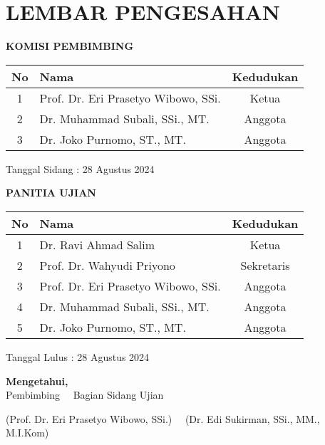 \chapter*{LEMBAR PENGESAHAN}

\begin{center}

\vspace{0.75cm}

{\bf KOMISI PEMBIMBING}

\vspace{0.5cm}

\begin{tabular}{|c|p{7cm}|c|}
\hline
\textbf{No} & \centering\textbf{Nama} & \textbf{Kedudukan}\\
\hline

 1& Prof. Dr. Eri Prasetyo Wibowo, SSi. & Ketua \\ \hline
 2 & Dr. Muhammad Subali, SSi., MT. & \phantom{Anggota } Anggota \phantom{ Anggota}\\ \hline
 3 & Dr. Joko Purnomo, ST., MT. & Anggota \\ \hline
\end{tabular}

\vspace{0.1cm}
\begin{flushright}
{Tanggal Sidang : 28 Agustus 2024 \phantom{t}}
\end{flushright}

\vspace{0.5cm}

{\bf PANITIA UJIAN}

\vspace{0.5cm}

\begin{tabular}{|c|p{7cm}|c|}
\hline
\textbf{No} & \textbf{Nama} & \textbf{Kedudukan}\\
\hline

1 & Dr. Ravi Ahmad Salim & Ketua \\ \hline
2 & Prof. Dr. Wahyudi Priyono & Sekretaris \\ \hline
3 & Prof. Dr. Eri Prasetyo Wibowo, SSi. & Anggota \\ \hline
4 & Dr. Muhammad Subali, SSi., MT. & \phantom{Anggota } Anggota \phantom{ Anggota}\\ \hline
5 & Dr. Joko Purnomo, ST., MT. & Anggota \\ \hline
\end{tabular}

\vspace{0.1cm}
\begin{flushright}
{Tanggal Lulus : 28 Agustus 2024 \phantom{t}}
\end{flushright}

\vspace{1cm}

\centering \textbf{Mengetahui,} \\
{Pembimbing~ \hspace{3.7cm} ~Bagian Sidang Ujian}\\%

\vspace{2.5cm}

{(Prof. Dr. Eri Prasetyo Wibowo, SSi.)~ \hfill ~(Dr. Edi Sukirman, SSi., MM., M.I.Kom)}%



\end{center}

\pagebreak